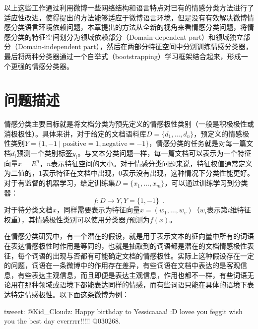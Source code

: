 以上这些工作通过利用微博一些网络结构和语言特点对已有的情感分类方法进行了适应性改进，使得提出的方法能够适应于微博语言环境，但是没有有效解决微博情感分类语言环境依赖问题，本章提出的方法从全新的视角来看情感分类问题，将情感分类的特征空间划分为领域依赖部分（Domain-dependent part）和领域独立部分（Domain-independent part），然后在两部分特征空间中分别训练情感分类器，最后将两种分类器通过一个自举式（bootstrapping）学习框架结合起来，形成一个更强的情感分类器。

\section{问题描述}
\label{ch4_form}
情感分类主要目标就是将文档分类为预先定义的情感极性类别（一般是积极极性或消极极性）。具体来讲，对于给定的文档语料库$ D=\lbrace d_{1},\dots ,d_{n} \rbrace$，预定义的情感极性类别$ Y=\lbrace 1,-1\mid \mathrm{positive}=1,\mathrm{negative}=-1 \rbrace$，情感分类的任务就是对每一篇文档$ d_{i} $预测一个类别标签$ y_{i} $。与文本分类问题一样，每一篇文档可以表示为一个特征向量$ x=R^{n} $，$ n $表示特征空间的大小。对于情感分类问题来说，特征权值通常定义为二值的，1表示特征在文档中出现，0表示没有出现，这种情况下分类性能更好。对于有监督的机器学习，给定训练集$ D=\lbrace x_{1},\dots,x_{m} \rbrace $，可以通过训练学习到分类器：
\begin{equation}
\label{e1}
  f:D \rightarrow Y, Y=\lbrace 1,-1 \rbrace \enspace .
\end{equation} 
对于待分类文档$ x $，同样需要表示为特征向量$ x=\left( w_{1},\dots,w_{v} \right)  $（$ w_{i} $表示第$ i $维特征权重），其情感极性类别可以使用分类器$ f $预测为$ f \left( x \right)   $。

在情感分类研究中，有一个潜在的假设，就是用于表示文本的征向量中所有的词语在表达情感极性时作用是等同的，也就是抽取到的词语都是潜在的文档情感极性表征，每个词语的出现与否都有可能确定文档的情感极性。实际上这种假设存在一定的问题，词语在一条微博中的作用存在差异，有些词语在文档中表达的是客观信息，有些表达主观信息，而且即便是表达主观信息，作用也都不一样，有些词语无论用在那种领域或语境下都能表达同样的情感，而有些词语只能在具体的语境下表达特定情感极性。以下面这条微博为例：

\begin{description}
\item{tweeet:} @Kid\_Cloudz: Happy birthday to Yessicaaaa! :D lovee you feggit wish you the best day everrrrr!!!!! @030268.
\end{description}

